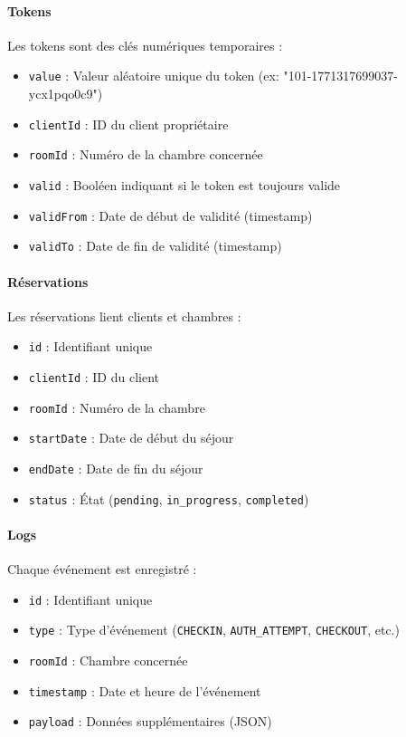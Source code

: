 \documentclass[11pt,a4paper]{article}
\begin{document}
\paragraph{Tokens}
Les tokens sont des clés numériques temporaires :
\begin{itemize}
    \item \texttt{value} : Valeur aléatoire unique du token (ex: "101-1771317699037-ycx1pqo0c9")
    \item \texttt{clientId} : ID du client propriétaire
    \item \texttt{roomId} : Numéro de la chambre concernée
    \item \texttt{valid} : Booléen indiquant si le token est toujours valide
    \item \texttt{validFrom} : Date de début de validité (timestamp)
    \item \texttt{validTo} : Date de fin de validité (timestamp)
\end{itemize}

\paragraph{Réservations}
Les réservations lient clients et chambres :
\begin{itemize}
    \item \texttt{id} : Identifiant unique
    \item \texttt{clientId} : ID du client
    \item \texttt{roomId} : Numéro de la chambre
    \item \texttt{startDate} : Date de début du séjour
    \item \texttt{endDate} : Date de fin du séjour
    \item \texttt{status} : État (\texttt{pending}, \texttt{in\_progress}, \texttt{completed})
\end{itemize}

\paragraph{Logs}
Chaque événement est enregistré :
\begin{itemize}
    \item \texttt{id} : Identifiant unique
    \item \texttt{type} : Type d'événement (\texttt{CHECKIN}, \texttt{AUTH\_ATTEMPT}, \texttt{CHECKOUT}, etc.)
    \item \texttt{roomId} : Chambre concernée
    \item \texttt{timestamp} : Date et heure de l'événement
    \item \texttt{payload} : Données supplémentaires (JSON)
\end{itemize}
\end{document}
